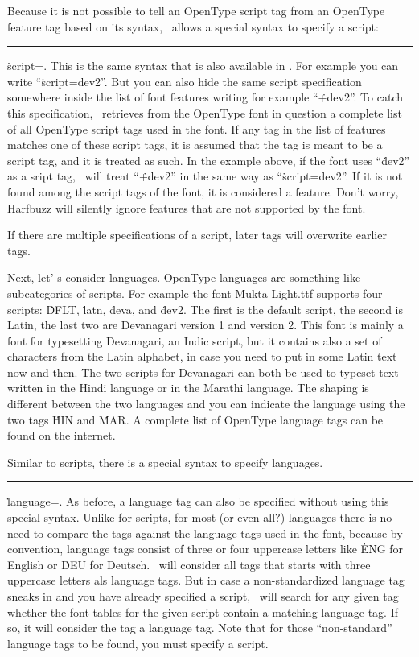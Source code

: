 Because it is not possible to tell an OpenType script tag from an OpenType feature tag
based on its syntax, \HiTeX\ allows a special syntax to specify a script:
\medskip
\rule{}: \.{script=}.
\medskip
This is the same syntax that is also available in \XeTeX.
For example you can write ``\.{script=dev2}''.
But you can also hide the same script specification somewhere
inside the list of font features writing for example ``\.{+dev2}''. To catch this specification,
\HiTeX\ retrieves from the OpenType font in question a complete list of all OpenType script
tags used in the font. If any tag in the list of features matches one of these script tags,
it is assumed that the tag is meant to be a script tag, and it is treated as such.
In the example above, if the font uses ``\.{dev2}'' as a sript tag, \HiTeX\ will treat
``\.{+dev2}'' in the same way as ``\.{script=dev2}''. If it is not found among the
script tags of the font, it is considered a feature. Don't worry, Harfbuzz will silently
ignore features that are not supported by the font.

If there are multiple specifications of a script, later tags will overwrite earlier tags.

Next, let' s consider languages. OpenType languages are something like subcategories
of scripts. For example the font \.{Mukta-Light.ttf} supports four scripts:
\.{DFLT}, \.{latn}, \.{deva}, and \.{dev2}. The first is the default script, the second is Latin,
the last two are Devanagari version 1 and version 2. This font is mainly a font for
typesetting Devanagari, an Indic script, but it contains also a set of characters from the Latin alphabet,
in case you need to put in some Latin text now and then. The two scripts for Devanagari
can both be used to typeset text written in the Hindi language or in the Marathi
language. The shaping is different between the two languages and you can indicate the
language using the two tags \.{HIN} and \.{MAR}.
A complete list of OpenType language tags can be found on the internet.


Similar to scripts, there is a special syntax to specify languages.
\medskip
\rule{}: \.{language=}.
\medskip
As before, a language tag can also be specified without using this special syntax.
Unlike for scripts, for most (or even all?) languages there is no need to compare the tags against
the language tags used in the font, because by convention, language tags consist of
three or four uppercase letters like \.{ENG} for English or \.{DEU} for Deutsch.
\HiTeX\ will consider all tags that starts with three uppercase letters als
language tags. But in case a non-standardized language tag sneaks in and you have
already specified a script, \HiTeX\ will search for any given tag whether the font tables
for the given script contain a matching language tag. If so, it will consider the tag
a language tag.
Note that for those ``non-standard'' language tags to be found, you must specify a script.

